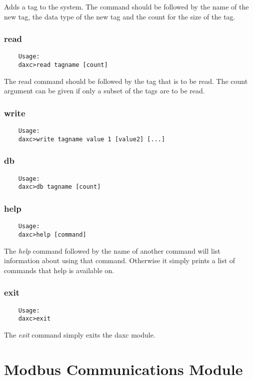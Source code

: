 	Adds a tag to the system.  The command should be followed by the name of the new
	tag, the data type of the new tag and the count for the size of the tag.

	\subsection{read}
	\begin{verbatim}
	Usage:
	daxc>read tagname [count]
	\end{verbatim}

	The read command should be followed by the tag that is to be read.  The
	count argument can be given if only a subset of the tags are to be read.

	\subsection{write}
	\begin{verbatim}
	Usage:
	daxc>write tagname value 1 [value2] [...]
	\end{verbatim}

	\subsection{db}
	\begin{verbatim}
	Usage:
	daxc>db tagname [count]
	\end{verbatim}

	\subsection{help}
	\begin{verbatim}
	Usage:
	daxc>help [command]
	\end{verbatim}

	The \textit{help} command followed by the name of another command will list
	information about using that command. Otherwise it simply prints a list of
	commands that help is available on.

	\subsection{exit}
	\begin{verbatim}
	Usage:
	daxc>exit
	\end{verbatim}
	The \textit{exit} command simply exits the daxc module.

	\chapter{Modbus Communications Module}
	

